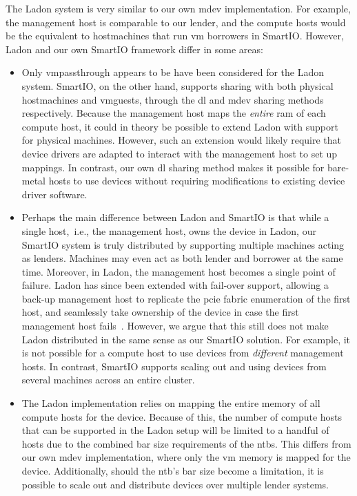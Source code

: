 The Ladon system is very similar to our own \gls{mdev} implementation.
%
For example, the management host is comparable to our \gls{lender}, and the compute hosts would be the equivalent to \glspl{hostmachine} that run \gls{vm} \glspl{borrower} in SmartIO.
%
However, Ladon and our own SmartIO framework differ in some areas:
\begin{itemize}
    \item 
        Only \gls{vmpassthrough} appears to be have been considered for the Ladon system.
        SmartIO, on the other hand, supports sharing with both physical \glspl{hostmachine} and \glspl{vmguest}, through the \gls{dl} and \gls{mdev} sharing methods respectively.
        Because the management host maps the \emph{entire} \gls{ram} of each compute host, it could in theory be possible to extend Ladon with support for physical machines. 
        However, such an extension would likely require that device drivers are adapted to interact with the management host to set up mappings.
        In contrast, our own \gls{dl} sharing method makes it possible for bare-metal hosts to use devices without requiring modifications to existing device driver software.

    \item
        Perhaps the main difference between Ladon and SmartIO is that while a single host,~i.e., the management host, owns the device in Ladon, our SmartIO system is truly distributed by supporting multiple machines acting as \glspl{lender}.
        Machines may even act as both \gls{lender} and \gls{borrower} at the same time.
        Moreover, in Ladon, the management host becomes a single point of failure.
        Ladon has since been extended with fail-over support, allowing a back-up management host to replicate the \gls{pcie} fabric enumeration of the first host, and seamlessly take ownership of the device in case the first management host fails~\cite{Tu2018}.
        However, we argue that this still does not make Ladon distributed in the same sense as our SmartIO solution.
        For example, it is not possible for a compute host to use devices from \emph{different} management hosts.
        In contrast, SmartIO supports scaling out and using devices from several machines across an entire cluster.

    \item
        The Ladon implementation relies on mapping the entire memory of all compute hosts for the device.
        Because of this, the number of compute hosts that can be supported in the Ladon setup will be limited to a handful of hosts due to the combined \gls{bar} size requirements of the \glspl{ntb}.
        This differs from our own \gls{mdev} implementation, where only the \gls{vm} memory is mapped for the device.
        Additionally, should the \gls{ntb}'s \gls{bar} size become a limitation, it is possible to scale out and distribute devices over multiple lender systems.
        
\end{itemize}



